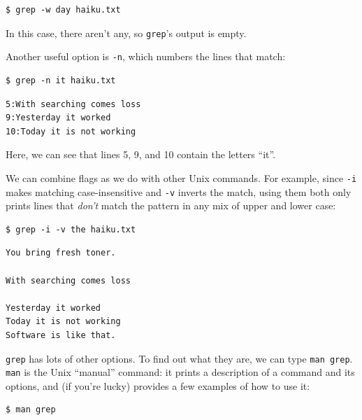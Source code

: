 \documentclass{book}
\begin{document}
\begin{verbatim}
$ grep -w day haiku.txt
\end{verbatim}

In this case, there aren't any, so \texttt{grep}'s output is empty.

Another useful option is \texttt{-n}, which numbers the lines that
match:

\begin{verbatim}
$ grep -n it haiku.txt
\end{verbatim}

\begin{verbatim}
5:With searching comes loss
9:Yesterday it worked
10:Today it is not working
\end{verbatim}

Here, we can see that lines 5, 9, and 10 contain the letters ``it''.

We can combine flags as we do with other Unix commands. For example,
since \texttt{-i} makes matching case-insensitive and \texttt{-v}
inverts the match, using them both only prints lines that \emph{don't}
match the pattern in any mix of upper and lower case:

\begin{verbatim}
$ grep -i -v the haiku.txt
\end{verbatim}

\begin{verbatim}
You bring fresh toner.

With searching comes loss

Yesterday it worked
Today it is not working
Software is like that.
\end{verbatim}

\texttt{grep} has lots of other options. To find out what they are, we
can type \texttt{man grep}. \texttt{man} is the Unix ``manual'' command:
it prints a description of a command and its options, and (if you're
lucky) provides a few examples of how to use it:

\begin{verbatim}
$ man grep
\end{verbatim}
\end{document}
